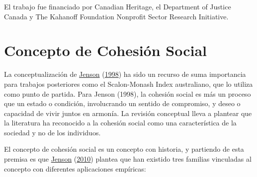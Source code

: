 \documentclass[
  12pt,
]{book}
\begin{document}
El trabajo fue financiado por Canadian Heritage, el Department of
Justice Canada y The Kahanoff Foundation Nonprofit Sector Research
Initiative.

\hypertarget{concepto-de-cohesiuxf3n-social}{%
\section{Concepto de Cohesión Social}\label{concepto-de-cohesiuxf3n-social}}

La conceptualización de \protect\hyperlink{ref-jenson1998mapping}{Jenson} (\protect\hyperlink{ref-jenson1998mapping}{1998}) ha sido un recurso de suma importancia para trabajos posteriores como el Scalon-Monash Index australiano, que lo utiliza como punto de partida. Para Jenson (1998), la cohesión social es más un proceso que un estado o condición, involucrando un sentido de compromiso, y deseo o capacidad de vivir juntos en armonía. La revisión conceptual lleva a plantear que la literatura ha reconocido a la cohesión social como una característica de la
sociedad y no de los individuos.

El concepto de cohesión social es un concepto con historia, y partiendo de esta premisa es que \protect\hyperlink{ref-jenson2010defining}{Jenson} (\protect\hyperlink{ref-jenson2010defining}{2010}) plantea que han existido tres familias vinculadas al concepto con diferentes aplicaciones empíricas:
\end{document}
